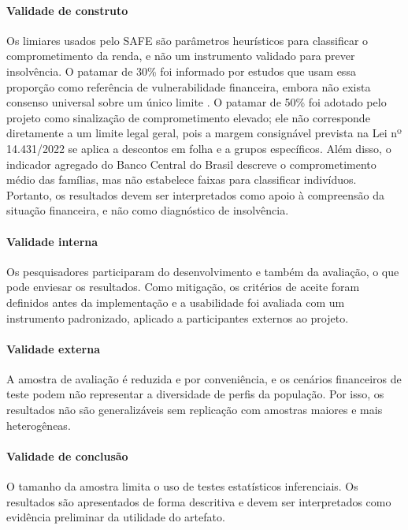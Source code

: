 \documentclass[portuguese]{sbc2025}%
\begin{document}
\paragraph{Validade de construto}

Os limiares usados pelo SAFE são parâmetros heurísticos para classificar o comprometimento da renda, e não um instrumento validado para prever insolvência. O patamar de 30\% foi informado por estudos que usam essa proporção como referência de vulnerabilidade financeira, embora não exista consenso universal sobre um único limite \citep{faruqui2008}. O patamar de 50\% foi adotado pelo projeto como sinalização de comprometimento elevado; ele não corresponde diretamente a um limite legal geral, pois a margem consignável prevista na Lei nº 14.431/2022 \citep{lei14431} se aplica a descontos em folha e a grupos específicos. Além disso, o indicador agregado do Banco Central do Brasil \citep{bcb29034} descreve o comprometimento médio das famílias, mas não estabelece faixas para classificar indivíduos. Portanto, os resultados devem ser interpretados como apoio à compreensão da situação financeira, e não como diagnóstico de insolvência.

\paragraph{Validade interna}

Os pesquisadores participaram do desenvolvimento e também da avaliação, o que pode enviesar os resultados. Como mitigação, os critérios de aceite foram definidos antes da implementação e a usabilidade foi avaliada com um instrumento padronizado, aplicado a participantes externos ao projeto.

\paragraph{Validade externa}

A amostra de avaliação é reduzida e por conveniência, e os cenários financeiros de teste podem não representar a diversidade de perfis da população. Por isso, os resultados não são generalizáveis sem replicação com amostras maiores e mais heterogêneas.

\paragraph{Validade de conclusão}

O tamanho da amostra limita o uso de testes estatísticos inferenciais. Os resultados são apresentados de forma descritiva e devem ser interpretados como evidência preliminar da utilidade do artefato.
\end{document}

